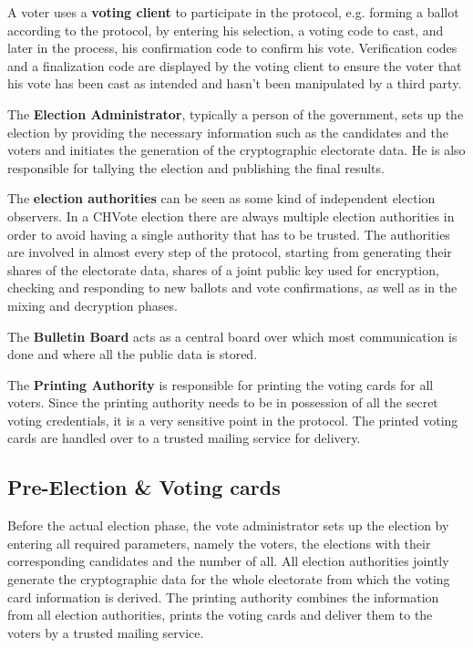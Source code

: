A voter uses a \textbf{voting client} to participate in the protocol, e.g. forming a ballot according to the protocol, by entering his selection, a voting code to cast, and later in the process, his confirmation code to confirm his vote. Verification codes and a finalization code are displayed by the voting client to ensure the voter that his vote has been cast as intended and hasn't been manipulated by a third party.

The \textbf{Election Administrator}, typically a person of the government, sets up the election by providing the necessary information such as the candidates and the voters and initiates the generation of the cryptographic electorate data. He is also responsible for tallying the election and publishing the final results.

The \textbf{election authorities} can be seen as some kind of independent election observers. In a CHVote election there are always multiple election authorities in order to avoid having a single authority that has to be trusted. The authorities are involved in almost every step of the protocol, starting from generating their shares of the electorate data, shares of a joint public key used for encryption, checking and responding to new ballots and vote confirmations, as well as in the mixing and decryption phases.

The \textbf{Bulletin Board} acts as a central board over which most communication is done and where all the public data is stored.

The \textbf{Printing Authority} is responsible for printing the voting cards for all voters. Since the printing authority needs to be in possession of all the secret voting credentials, it is a very sensitive point in the protocol. The printed voting cards are handled over to a trusted mailing service for delivery.

\subsection{Pre-Election \& Voting cards}
Before the actual election phase, the vote administrator sets up the election by entering all required parameters, namely the voters, the elections with their corresponding candidates and the number of all. All election authorities jointly generate the cryptographic data for the whole electorate from which the voting card information is derived. The printing authority combines the information from all election authorities, prints the voting cards and deliver them to the voters by a trusted mailing service. 

